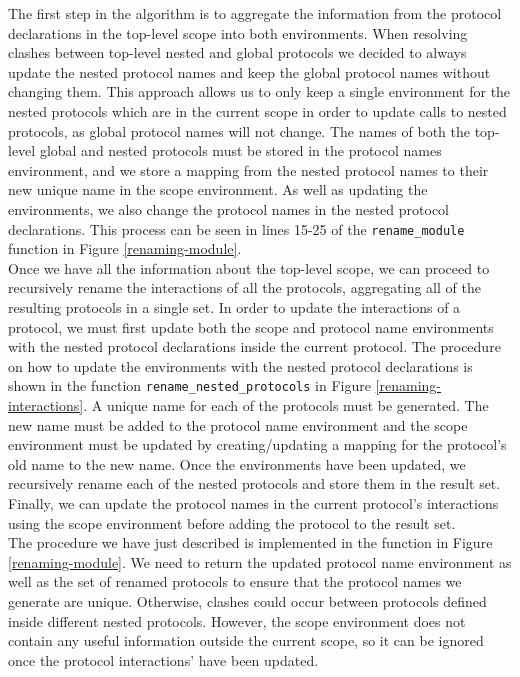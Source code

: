 \documentclass[12pt,twoside]{report}
\begin{document}
The first step in the algorithm is to aggregate the information from the protocol declarations in the top-level scope into both environments. When resolving clashes between top-level nested and global protocols we decided to always update the nested protocol names and keep the global protocol names without changing them. This approach allows us to only keep a single environment for the nested protocols which are in the current scope in order to update calls to nested protocols, as global protocol names will not change. The names of both the top-level global and nested protocols must be stored in the protocol names environment, and we store a mapping from the nested protocol names to their new unique name in the scope environment. As well as updating the environments, we also change the protocol names in the nested protocol declarations. This process can be seen in lines 15-25 of the \texttt{rename\_module} function in Figure \ref{renaming-module}.\\

Once we have all the information about the top-level scope, we can proceed to recursively rename the interactions of all the protocols, aggregating all of the resulting protocols in a single set. In order to update the interactions of a protocol, we must first update both the scope and protocol name environments with the nested protocol declarations inside the current protocol. The procedure on how to update the environments with the nested protocol declarations is shown in the function \texttt{rename\_nested\_protocols} in Figure \ref{renaming-interactions}. A unique name for each of the protocols must be generated. The new name must be added to the protocol name environment and the scope environment must be updated by creating/updating a mapping for the protocol's old name to the new name. Once the environments have been updated, we recursively rename each of the nested protocols and store them in the result set. Finally, we can update the protocol names in the current protocol's interactions using the scope environment before adding the protocol to the result set.\\

The procedure we have just described is implemented in the \texttt{} function in Figure \ref{renaming-module}. We need to return the updated protocol name environment as well as the set of renamed protocols to ensure that the protocol names we generate are unique. Otherwise, clashes could occur between protocols defined inside different nested protocols. However, the scope environment does not contain any useful information outside the current scope, so it can be ignored once the protocol interactions' have been updated. \\
\end{document}
